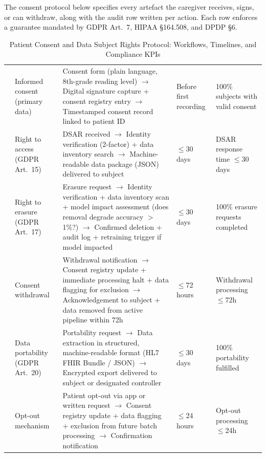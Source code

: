 \noindent The consent protocol below specifies every artefact the caregiver receives, signs, or can withdraw, along with the audit row written per action. Each row enforces a guarantee mandated by GDPR Art.~7, HIPAA \S164.508, and DPDP \S6.
{\tablestripes\tablefontsize

\begin{xltabular}{\textwidth}{@{} p{1.0cm} p{2.5cm} p{6.2cm} p{2.0cm} p{2.7cm} @{}}
\caption[Patient Consent and Data Subject Rights Protocol]{Patient Consent and Data Subject Rights Protocol: Workflows, Timelines, and Compliance KPIs}\label{tab:consent_protocol} \\
\toprule
\thead{\#} &  &  &  &  \\
\midrule
\endfirsthead
\endhead
\bottomrule
{} & Informed consent (primary data) & Consent form (plain language, 8th-grade reading level) $\to$ Digital signature capture + consent registry entry $\to$ Timestamped consent record linked to patient ID & Before first recording & 100\% subjects with valid consent \\
 & Right to access (GDPR Art.~15) & DSAR received $\to$ Identity verification (2-factor) + data inventory search $\to$ Machine-readable data package (JSON) delivered to subject & $\leq$30 days & DSAR response time $\leq$30 days \\
 & Right to erasure (GDPR Art.~17) & Erasure request $\to$ Identity verification + data inventory scan + model impact assessment (does removal degrade accuracy $>$1\%?) $\to$ Confirmed deletion + audit log + retraining trigger if model impacted & $\leq$30 days & 100\% erasure requests completed \\
 & Consent withdrawal & Withdrawal notification $\to$ Consent registry update + immediate processing halt + data flagging for exclusion $\to$ Acknowledgement to subject + data removed from active pipeline within 72h & $\leq$72 hours & Withdrawal processing $\leq$72h \\
 & Data portability (GDPR Art.~20) & Portability request $\to$ Data extraction in structured, machine-readable format (HL7 FHIR Bundle / JSON) $\to$ Encrypted export delivered to subject or designated controller & $\leq$30 days & 100\% portability fulfilled \\
 & Opt-out mechanism & Patient opt-out via app or written request $\to$ Consent registry update + data flagging + exclusion from future batch processing $\to$ Confirmation notification & $\leq$24 hours & Opt-out processing $\leq$24h \\

\end{xltabular}}
